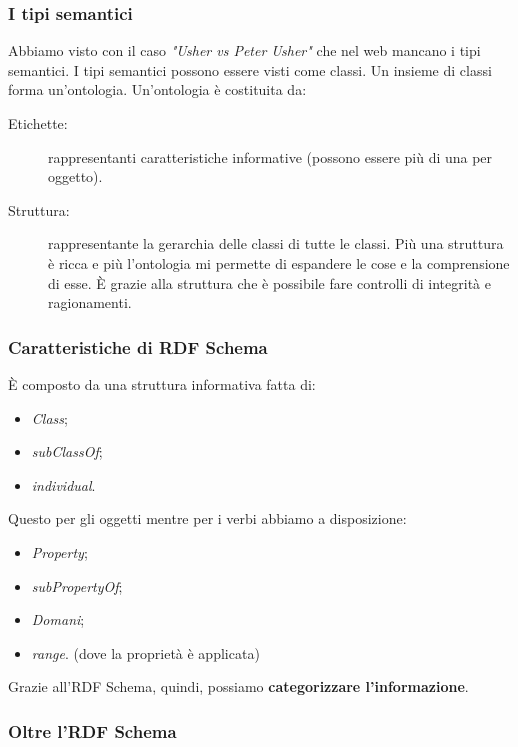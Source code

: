 			\subsubsection{I tipi semantici}
				Abbiamo visto con il caso \emph{"Usher vs Peter Usher"} che nel web mancano i tipi semantici. I tipi semantici possono essere visti come classi. Un insieme di classi forma un'ontologia. Un'ontologia è costituita da:
				\begin{description}
					\item[Etichette:] rappresentanti caratteristiche informative (possono essere più di una per oggetto).
					\item[Struttura:] rappresentante la gerarchia delle classi di tutte le classi. Più una struttura è ricca e più l'ontologia mi permette di espandere le cose e la comprensione di esse. È grazie alla struttura che è possibile fare controlli di integrità e ragionamenti. 
				\end{description}
				
			\subsubsection{Caratteristiche di RDF Schema}
				È composto da una struttura informativa fatta di:
				\begin{itemize}
					\item \emph{Class};
					\item \emph{subClassOf};
					\item \emph{individual}.
				\end{itemize}
				Questo per gli oggetti mentre per i verbi abbiamo a disposizione:
				\begin{itemize}
					\item \emph{Property};
					\item \emph{subPropertyOf};
					\item \emph{Domani};
					\item \emph{range}. (dove la proprietà è applicata)
				\end{itemize}
				Grazie all'RDF Schema, quindi, possiamo \textbf{categorizzare l'informazione}.

			\subsubsection{Oltre l'RDF Schema}
			
